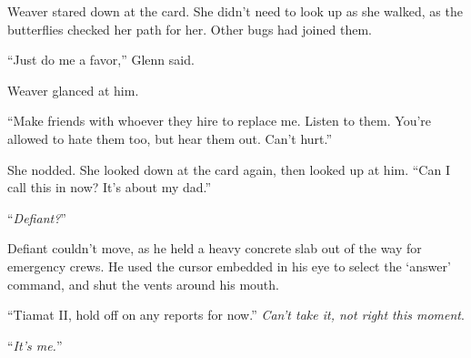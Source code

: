 Weaver stared down at the card.  She didn't need to look up as she walked, as the butterflies checked her path for her.  Other bugs had joined them.



``Just do me a favor,'' Glenn said.



Weaver glanced at him.



``Make friends with whoever they hire to replace me.  Listen to them.  You're allowed to hate them too, but hear them out.  Can't hurt.''



She nodded.  She looked down at the card again, then looked up at him.  ``Can I call this in now?  It's about my dad.''



\sectionbreak



``\emph{Defiant?}''



Defiant couldn't move, as he held a heavy concrete slab out of the way for emergency crews.  He used the cursor embedded in his eye to select the `answer' command, and shut the vents around his mouth.



``Tiamat II, hold off on any reports for now.'' \emph{Can't take it, not right this moment}.



``\emph{It's me.}''





